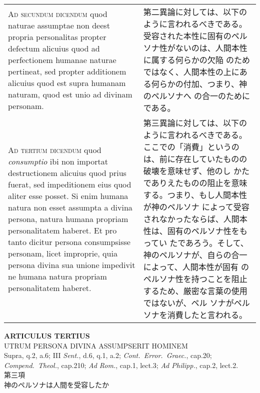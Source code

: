 \documentclass[10pt]{jsarticle} %
\begin{document}
\begin{longtable}{p{21em}p{21em}}
\\




{\scshape Ad secundum dicendum} quod naturae assumptae non deest propria
personalitas propter defectum alicuius quod ad perfectionem humanae
naturae pertineat, sed propter additionem alicuius quod est supra
humanam naturam, quod est unio ad divinam personam.


&

第二異論に対しては、以下のように言われるべきである。
受容された本性に固有のペルソナ性がないのは、人間本性に属する何らかの欠陥
 のためではなく、人間本性の上にある何らかの付加、つまり、神のペルソナへ
 の合一のためにである。


\\




{\scshape Ad tertium dicendum} quod {\itshape consumptio} ibi non importat destructionem
alicuius quod prius fuerat, sed impeditionem eius quod aliter esse
posset. Si enim humana natura non esset assumpta a divina persona,
natura humana propriam personalitatem haberet. Et pro tanto dicitur
persona consumpsisse personam, licet improprie, quia persona divina sua
unione impedivit ne humana natura propriam personalitatem haberet.


&

第三異論に対しては、以下のように言われるべきである。
ここでの「消費」というのは、前に存在していたものの破壊を意味せず、他のし
 かたでありえたものの阻止を意味する。つまり、もし人間本性が神のペルソナ
 によって受容されなかったならば、人間本性は、固有のペルソナ性をもってい
 たであろう。そして、神のペルソナが、自らの合一によって、人間本性が固有
 のペルソナ性を持つことを阻止するため、厳密な言葉の使用ではないが、ペル
 ソナがペルソナを消費したと言われる。



\end{longtable}
\newpage








\begin{center}
 {\Large {\bf ARTICULUS TERTIUS}}\\
 {\large UTRUM PERSONA DIVINA ASSUMPSERIT HOMINEM}\\
 {\footnotesize Supra, q.2, a.6; III {\itshape Sent.}, d.6, q.1, a.2;
 {\itshape Cont.~Error.~Graec.}, cap.20; {\itshape Compend.~Theol.},
 cap.210; {\itshape Ad Rom.}, cap.1, lect.3; {\itshape Ad Philipp.},
 cap.2, lect.2.}\\
 {\Large 第三項\\神のペルソナは人間を受容したか}
\end{center}
\end{document}
